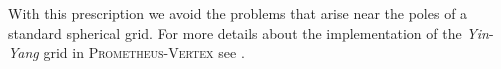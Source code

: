With this prescription we avoid the problems that arise
near the poles of a standard spherical grid.
For more details about the implementation of the \textit{Yin}-\textit{Yang} grid
in \textsc{Prometheus-Vertex} see \cite{melson_phd}.  

